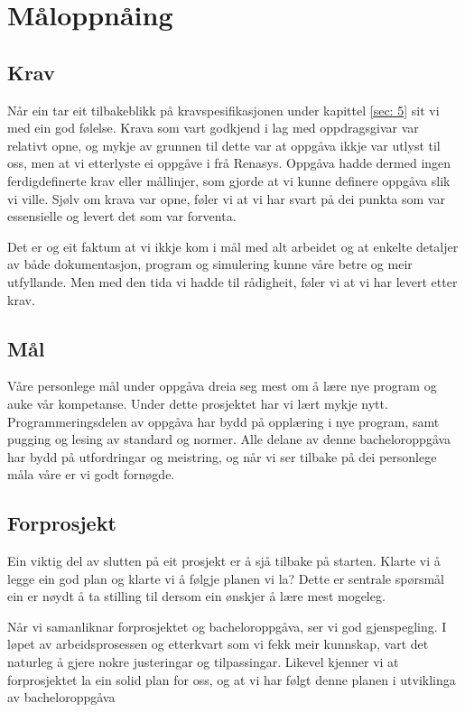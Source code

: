 \section{Måloppnåing}
\thispagestyle{fancy}

\subsection{Krav}
Når ein tar eit tilbakeblikk på kravspesifikasjonen under kapittel \ref{sec: 5} sit vi med ein god følelse.
Krava som vart godkjend i lag med oppdragsgivar var relativt opne, og 
mykje av grunnen til dette var at oppgåva ikkje var utlyst til oss, men at vi etterlyste ei oppgåve i frå \gls{Renasys}.
Oppgåva hadde dermed ingen ferdigdefinerte krav eller mållinjer, som gjorde at vi kunne definere oppgåva slik vi ville.
Sjølv om krava var opne, føler vi at vi har svart på dei punkta som var essensielle og levert det som var forventa.

Det er og eit faktum at vi ikkje kom i mål med alt arbeidet og at enkelte detaljer av både dokumentasjon, program og simulering
kunne våre betre og meir utfyllande. Men med den tida vi hadde til rådigheit, føler vi at vi har levert etter krav.

\subsection{Mål}
Våre personlege mål under oppgåva dreia seg mest om å lære nye program og auke vår kompetanse. Under dette prosjektet har vi lært mykje nytt. 
Programmeringsdelen av oppgåva har bydd på opplæring i nye program, samt pugging og lesing av standard og normer.
Alle delane av denne bacheloroppgåva har bydd på utfordringar og meistring, og når vi ser tilbake på dei personlege måla våre er vi godt fornøgde.

\subsection{Forprosjekt}
Ein viktig del av slutten på eit prosjekt er å sjå tilbake på starten.
Klarte vi å legge ein god plan og klarte vi å følgje planen vi la?
Dette er sentrale spørsmål ein er nøydt å ta stilling til dersom ein ønskjer å lære mest mogeleg.

Når vi samanliknar forprosjektet og bacheloroppgåva, ser vi god gjenspegling. 
I løpet av arbeidsprosessen og etterkvart som vi fekk meir kunnskap, vart det naturleg å gjere nokre justeringar og tilpassingar. 
Likevel kjenner vi at forprosjektet la ein solid plan for oss, og at vi har følgt denne planen i utviklinga av bacheloroppgåva



\newpage